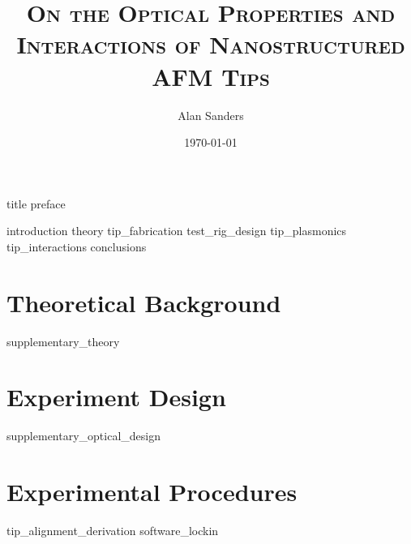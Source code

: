 \documentclass[12pt, a4paper, twoside, draft=false]{book}
\begin{document}
\title{\textsc{On the Optical Properties and Interactions of Nanostructured AFM Tips}}
\author{Alan Sanders}
\date{\today}

\frontmatter
\begin{singlespace*}
{title}
{preface}
\tableofcontents
\setcounter{tocdepth}{2}
\listoffigures
\end{singlespace*}

\mainmatter
{introduction}
{theory}
{tip_fabrication}
{test_rig_design}
{tip_plasmonics}
{tip_interactions}
{conclusions}

\begin{singlespace*}
\printbibliography[heading=bibintoc, notcategory=fullcited, resetnumbers=true]
\glsaddall
\printglossary[type=symbols, style=superborder]
\printglossary[type=\acronymtype, style=superheader]
\end{singlespace*}

\appendix
\cleardoublepage
{}
\chapter{Theoretical Background}
{supplementary_theory}
\chapter{Experiment Design}
{supplementary_optical_design}
\chapter{Experimental Procedures}
{tip_alignment_derivation}
{software_lockin}
\end{document}
